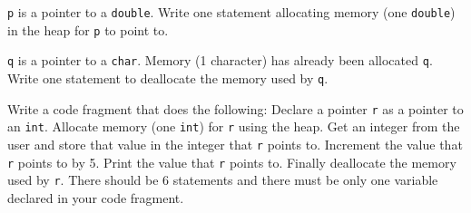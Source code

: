 

\nextq
\verb!p! is a pointer to a \verb!double!.
Write one statement allocating memory (one \verb!double!) in the heap
for \verb!p! to point to.
\\ \ANSWER
\begin{answercode}

\end{answercode}

\nextq
\verb!q! is a pointer to a \verb!char!.
Memory (1 character) has already been allocated \verb!q!.
Write one statement to deallocate the memory used by \verb!q!.
\\ \ANSWER
\begin{answercode}

\end{answercode}

\nextq
Write a code fragment that does the following:
Declare a pointer \verb!r! as a pointer to an \verb!int!.
Allocate memory (one \verb!int!) for \verb!r! using the heap.
Get an integer from the user and store that value in the integer
that \verb!r! points to.
Increment the value that \verb!r! points to by 5.
Print the value that \verb!r! points to.
Finally deallocate the memory used by \verb!r!.
There should be 6 statements and
there must be only one variable declared in your code fragment.
\\ \ANSWER
\begin{answercode}

\end{answercode}

